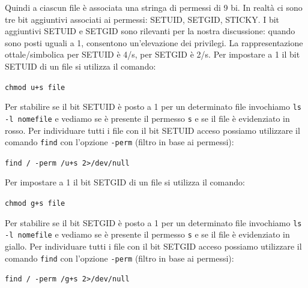 Quindi a ciascun file è associata una stringa di permessi di 9 bi. In realtà ci sono tre bit aggiuntivi associati ai permessi: SETUID, SETGID, STICKY. I bit aggiuntivi SETUID e SETGID sono rilevanti per la nostra discussione: quando sono posti uguali a 1, consentono un'elevazione dei privilegi. La rappresentazione ottale/simbolica per SETUID è 4/s, per SETGID è 2/s. Per impostare a 1 il bit SETUID di un file si utilizza il comando:

\begin{center}
    \texttt{chmod u+s file}
\end{center}

Per stabilire se il bit SETUID è posto a 1 per un determinato file invochiamo \texttt{ls -l nomefile} e vediamo se è presente il permesso \texttt{s} e se il file è evidenziato in rosso. Per individuare tutti i file con il bit SETUID acceso possiamo utilizzare il comando \texttt{find} con l'opzione \texttt{-perm} (filtro in base ai permessi):
\begin{center}
    \texttt{find / -perm /u+s 2>/dev/null}
\end{center}

Per impostare a 1 il bit SETGID di un file si utilizza il comando:

\begin{center}
    \texttt{chmod g+s file}
\end{center}

Per stabilire se il bit SETGID è posto a 1 per un determinato file invochiamo \texttt{ls -l nomefile} e vediamo se è presente il permesso \texttt{s} e se il file è evidenziato in giallo. Per individuare tutti i file con il bit SETGID acceso possiamo utilizzare il comando \texttt{find} con l'opzione \texttt{-perm} (filtro in base ai permessi):
\begin{center}
    \texttt{find / -perm /g+s 2>/dev/null}
\end{center}

